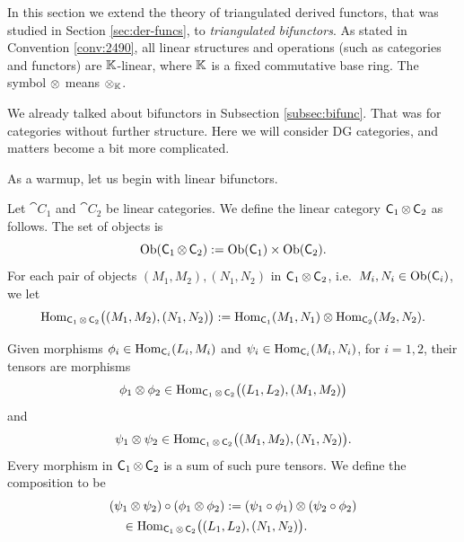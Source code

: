 
\renewcommand{\thisfile}{block3\_190328}   

\cleardoublepage
{} \label{sec:DG-tri-bifun}

\AYcopyright 
 
In this section we extend the theory of triangulated derived functors, that was 
studied in Section \ref{sec:der-funcs}, to  
{\em triangulated bifunctors}. As stated in Convention \ref{conv:2490}, all 
linear structures and operations (such as categories and functors) are  
$\mathbb{K}$-linear, where $\mathbb{K}$ is a fixed commutative base 
ring. The symbol $\otimes$ means $\otimes_{\mathbb{K}}$. 



 \label{subsec:dg-bifun}
We already talked about bifunctors in Subsection \ref{subsec:bifunc}. That 
was for categories without further structure. Here we will consider 
DG categories, and matters become a bit more complicated. 

As a warmup, let us begin with linear bifunctors. 

\begin{dfn} \label{dfn:5040}
Let $\cat{C}_1$ and $\cat{C}_2$ be linear categories. 
We define the linear category $\operatorname{\mathsf{C}}_1 \otimes \operatorname{\mathsf{C}}_2$ as follows. The 
set of objects is 
\[ \operatorname{Ob}(\operatorname{\mathsf{C}}_1 \otimes \operatorname{\mathsf{C}}_2) :=
\operatorname{Ob}(\operatorname{\mathsf{C}}_1) \times \operatorname{Ob}(\operatorname{\mathsf{C}}_2) . \]
For each pair of objects 
$(M_1, M_2), (N_1, N_2)$ in $\operatorname{\mathsf{C}}_1 \otimes \operatorname{\mathsf{C}}_2$,
i.e.\ $M_i, N_i \in \operatorname{Ob}(\operatorname{\mathsf{C}}_i)$,
we let 
\[ \operatorname{Hom}_{\operatorname{\mathsf{C}}_1 \otimes \operatorname{\mathsf{C}}_2}
\bigl( (M_1, M_2), (N_1, N_2) \bigr) := 
\operatorname{Hom}_{\operatorname{\mathsf{C}}_1} (M_1, N_1) \otimes 
\operatorname{Hom}_{\operatorname{\mathsf{C}}_2} (M_2, N_2) . \]

Given morphisms 
$\phi_i \in \operatorname{Hom}_{\operatorname{\mathsf{C}}_i}(L_i, M_i)$
and
$\psi_i \in \operatorname{Hom}_{\operatorname{\mathsf{C}}_i}(M_i, N_i)$, 
for $i = 1, 2$, their tensors are morphisms 
\[ \phi_1 \otimes \phi_2 \in \operatorname{Hom}_{\operatorname{\mathsf{C}}_1 \otimes \operatorname{\mathsf{C}}_2}
\bigl( (L_1, L_2), (M_1, M_2) \bigr) \]
and 
\[ \psi_1 \otimes \psi_2 \in 
\operatorname{Hom}_{\operatorname{\mathsf{C}}_1 \otimes \operatorname{\mathsf{C}}_2}
\bigl( (M_1, M_2), (N_1, N_2) \bigr) . \]
Every morphism in $\operatorname{\mathsf{C}}_1 \otimes \operatorname{\mathsf{C}}_2$ is a sum of such pure tensors. We 
define the composition to be 
\[ \begin{aligned}
& (\psi_1 \otimes \psi_2) \circ (\phi_1 \otimes \phi_2) := 
(\psi_1 \circ \phi_1) \otimes (\psi_2 \circ \phi_2)
\\ & \quad 
\in \operatorname{Hom}_{\operatorname{\mathsf{C}}_1 \otimes \operatorname{\mathsf{C}}_2}
\bigl( (L_1, L_2), (N_1, N_2) \bigr) .
\end{aligned} \]
\end{dfn}

